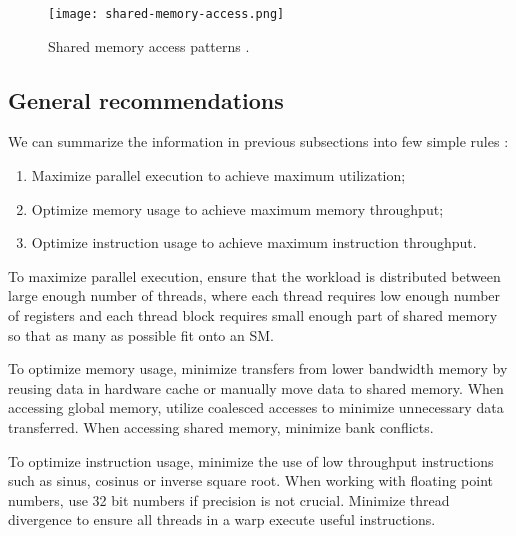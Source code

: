 \begin{figure}[h]
	\centering
	\texttt{[image: shared-memory-access.png]}
	\caption{Shared memory access patterns \citep{site:cuda}.}
	\label{fig:shared_memory_access}
\end{figure}

\subsection{General recommendations}

We can summarize the information in previous subsections into few simple rules \citep{site:cuda}:

\begin{enumerate}
	\item Maximize parallel execution to achieve maximum utilization;
	\item Optimize memory usage to achieve maximum memory throughput;
	\item Optimize instruction usage to achieve maximum instruction throughput.
\end{enumerate}

To maximize parallel execution, ensure that the workload is distributed between large enough number of threads, where each thread requires low enough number of registers and each thread block requires small enough part of shared memory so that as many as possible fit onto an SM.

To optimize memory usage, minimize transfers from lower bandwidth memory by reusing data in hardware cache or manually move data to shared memory. When accessing global memory, utilize coalesced accesses to minimize unnecessary data transferred. When accessing shared memory, minimize bank conflicts.

To optimize instruction usage, minimize the use of low throughput instructions such as sinus, cosinus or inverse square root. When working with floating point numbers, use 32 bit numbers if precision is not crucial. Minimize thread divergence to ensure all threads in a warp execute useful instructions.








